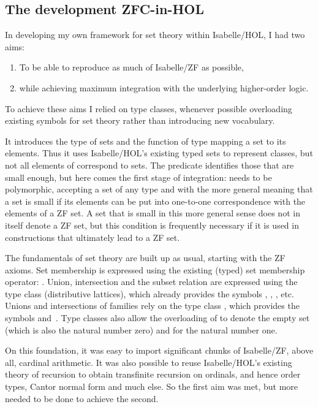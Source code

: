 \documentclass[runningheads]{llncs}
\begin{document}
\subsection{The development ZFC-in-HOL}

In developing my own framework for set theory within Isabelle/HOL, I had two aims:
\begin{enumerate}
	\item To be able to reproduce as much of Isabelle/ZF as possible,
	\item while achieving maximum integration with the underlying higher-order logic.
\end{enumerate}
To achieve these aims I relied on type classes, whenever possible overloading existing symbols for set theory rather than introducing new vocabulary.

It introduces the type  of sets and the function  of type  mapping  a set to its elements.
Thus it uses Isabelle/HOL's existing typed sets to represent classes, but not all elements of  correspond to sets.
The predicate  identifies those that are small enough, but here comes the first stage of integration:  needs to be polymorphic, accepting a set of any type and with the more general meaning that a set is small if its elements can be put into one-to-one correspondence with the elements of a ZF set.
A set that is small in this more general sense does not in itself denote a ZF set, but this condition is frequently necessary if it is used in constructions that ultimately lead to a ZF set.

The fundamentals of set theory are built up as usual, starting with the ZF axioms.
Set membership is expressed using the existing (typed) set membership operator: .
Union, intersection and the subset relation are expressed using the type class  (distributive lattices), which already provides the symbols \isa{\isasymsqunion}, \isa{\isasymsqinter}, \isa{\isasymle}, etc.
Unions and intersections of families rely on the type class , which provides the symbols \isa{\isasymSqunion} and~\isa{\isasymSqinter}.
Type classes also allow the overloading of  to denote the empty set (which is also the natural number zero) and  for the natural number one.

On this foundation, it was easy to import significant chunks of Isabelle/ZF, above all, cardinal arithmetic. It was also possible to reuse Isabelle/HOL's existing theory of recursion to obtain transfinite recursion on ordinals, and hence order types, Cantor normal form and much else. So the first aim was met, but more needed to be done to achieve the second.
\end{document}
